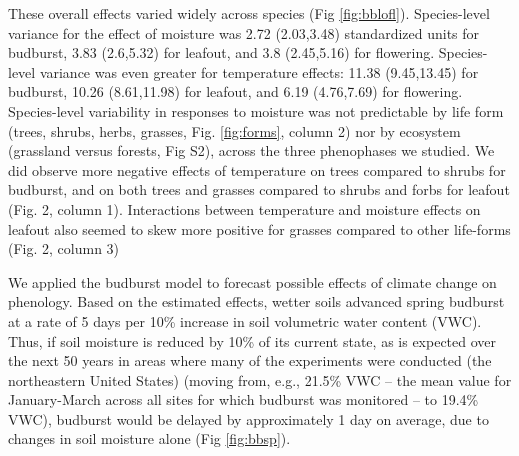\documentclass{article}
\begin{document}
\par These overall effects varied widely across species (Fig \ref{fig:bblofl}). Species-level variance for the effect of moisture was 2.72 (2.03,3.48) standardized units for budburst, 3.83 (2.6,5.32) for leafout, and 3.8 (2.45,5.16) for flowering. Species-level variance was even greater for temperature effects: 11.38 (9.45,13.45) for budburst, 10.26 (8.61,11.98) for leafout, and 6.19 (4.76,7.69) for flowering. 
Species-level variability in responses to moisture was not predictable by life form (trees, shrubs, herbs, grasses, Fig. \ref{fig:forms}, column 2)  nor by ecosystem (grassland versus forests, Fig S2), across the three phenophases we studied. We did observe more negative effects of temperature on trees compared to shrubs for budburst, and on both trees and grasses compared to shrubs and forbs for leafout (Fig. 2, column 1). Interactions between temperature and moisture effects on leafout also seemed to skew more positive for grasses compared to other life-forms (Fig. 2, column 3)
\par We applied the budburst model to forecast possible effects of climate change on phenology. Based on the estimated effects, wetter soils advanced spring budburst at a rate of 5 days per 10\% increase in soil volumetric water content (VWC). Thus, if soil moisture is reduced by 10\% of its current state, as is expected over the next 50 years in areas where many of the experiments were conducted (the northeastern United States) \citep{berg2017} (moving from, e.g., 21.5\% VWC -- the mean value for January-March across all sites for which budburst was monitored -- to 19.4\% VWC), budburst would be delayed by approximately 1 day on average, due to changes in soil moisture alone (Fig \ref{fig:bbsp}).
\end{document}
